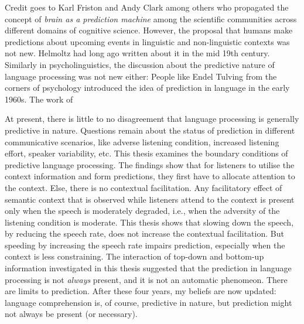 \documentclass[a4paper, nobind]{templates/ociamthesis}
\begin{document}
\begin{romanpages}
\begin{preface}
 Credit goes to Karl Friston and Andy Clark among others who propagated the concept of \emph{brain as a prediction machine} among the scientific communities across different domains of cognitive science.
 However, the proposal that humans make predictions about upcoming events in linguistic and non-linguistic contexts was not new.
 Helmoltz had long ago written about it in the mid 19th century.
 Similarly in psycholinguistics, the discussion about the predictive nature of language processing was not new either:
 People like Endel Tulving from the corners of psychology introduced the idea of prediction in language in the early 1960s.
 The work of

 At present, there is little to no disagreement that language processing is generally predictive in nature.
 Questions remain about the status of prediction in different communicative scenarios,
 like adverse listening condition, increased listening effort, speaker variability, etc.
 This thesis examines the boundary conditions of predictive language processing.
 The findings show that for listeners to utilise the context information and form predictions,
 they first have to allocate attention to the context.
 Else, there is no contextual facilitation.
 Any facilitatory effect of semantic context that is observed while listeners attend to the context is present only when the speech is moderately degraded,
 i.e., when the adversity of the listening condition is moderate.
 This thesis shows that slowing down the speech, by reducing the speech rate, does not increase the contextual facilitation.
 But speeding by increasing the speech rate impairs prediction, especially when the context is less constraining.
 The interaction of top-down and bottom-up information investigated in this thesis suggested that the prediction in language processing is not \emph{always} present,
 and it is not an automatic phenomeon.
 There are limits to prediction.
 After these four years, my beliefs are now updated: language comprehension is, of course, predictive in nature, but prediction might not always be present (or necessary).


\end{preface}
\end{romanpages}
\end{document}
